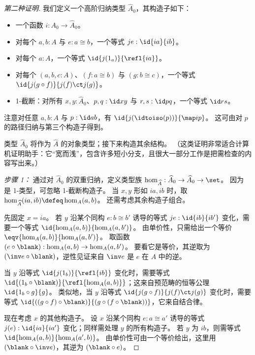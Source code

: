 \begin{proof}[第二种证明]
  我们定义一个高阶归纳类型 $\widehat A_0$，其构造子如下：
  \begin{itemize}
  \item 一个函数 $i:A_0 \to \widehat A_0$。
  \item 对每个 $a,b:A$ 与 $e:a\cong b$，一个等式 $je:\id{ia}{ib}$。
  \item 对每个 $a:A$，一个等式 $\id{j(1_a)}{\refl{ia}}$。
  \item 对每个 $(a,b,c:A)$、$(f:a\cong b)$ 与 $(g:b\cong c)$，一个等式 $\id{j(g \circ f)}{j(f)\ct j(g)}$。
  \item 1-截断：对所有 $x,y:\widehat A_0$、$p,q:\id x y$ 与 $r,s:\id p q$，一个等式 $\id r s$。
  \end{itemize}
  注意对任意 $a,b:A$ 与 $p:\id a b$，有 $\id{j(\idtoiso(p))}{\map i p}$。
  这可由对 $p$ 的路径归纳与第三个构造子得到。

  类型 $\widehat A_0$ 将作为 $\widehat A$ 的对象类型；接下来构造其余结构。
  （这类证明非常适合计算机证明助手：它“宽而浅”，包含许多短小分支，且很大一部分工作是把需检查的内容写出来。）

  \mentalpause

  \emph{步骤 1：} 通过对 $\widehat A_0$ 的双重归纳，定义类型族 $\hom_{\widehat A}:\widehat A_0\to \widehat A_0 \to \set$。
  因为 \set 是 1-类型，可忽略 1-截断构造子。
  当 $x,y$ 形如 $ia,ib$ 时，取 $\hom_{\widehat A}(ia,ib) \defeq \hom_A(a,b)$。
  还需考虑其余构造子组合。

  先固定 $x=ia$。
  若 $y$ 沿某个同构 $e:b\cong b'$ 诱导的等式 $je:\id{ib}{ib'}$ 变化，需要一个等式 $\id{\hom_A(a,b)}{\hom_A(a,b')}$。
  由单价性，只需给出一个等价 $\eqv{\hom_A(a,b)}{\hom_A(a,b')}$。
  取函数 $(e\circ \blank ):\hom_A(a,b)\to \hom_A(a,b')$。
  要看它是等价，其逆取为 $(\inv e\circ \blank )$，逆性见证来自 $\inv e$ 是 $e$ 在 $A$ 中的逆。

  当 $y$ 沿等式 $\id{j(1_b)}{\refl{ib}}$ 变化时，需要等式 $\id{(1_b\circ \blank )}{\refl{\hom_A(a,b)}}$；这来自预范畴的恒等公理 $\id{1_b\circ g}{g}$。
  类似地，当 $y$ 沿等式 $\id{j(g\circ f)}{j(f)\ct j(g)}$ 变化时，需要等式 $\id{((g\circ f)\circ \blank )}{(g\circ (f\circ \blank ))}$，它来自结合律。

  现在考虑 $x$ 的其他构造子。
  设 $x$ 沿某个同构 $e:a \cong a'$ 诱导的等式 $j(e):\id{ia}{ia'}$ 变化；同样需处理 $y$ 的所有构造子。
  若 $y$ 为 $ib$，则需等式 $\id{\hom_A(a,b)}{\hom_A(a',b)}$。
  由单价性可由一个等价给出，这里用 $(\blank\circ \inv e)$，其逆为 $(\blank\circ e)$。


\end{proof}
